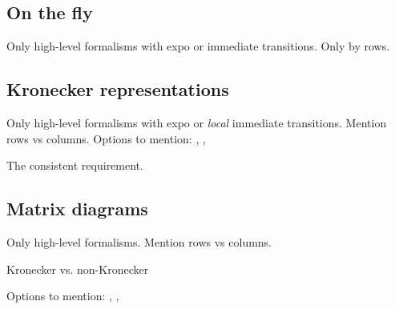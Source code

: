 {%
\subsection{On the fly}
Only high-level formalisms with expo or immediate transitions.
Only by rows.
\cite{Deavours1997onthefly}

\subsection{Kronecker representations}
Only high-level formalisms with expo or \emph{local} immediate transitions.
Mention rows vs columns.
Options to mention: , ,

The consistent requirement.

\subsection{Matrix diagrams}
Only high-level formalisms.
Mention rows vs columns.

Kronecker \cite{1999PNPM-MatrixDiagrams, MinerThesis2000} vs. non-Kronecker
\cite{Miner2001canonicalMDs}

Options to mention: , ,

}
